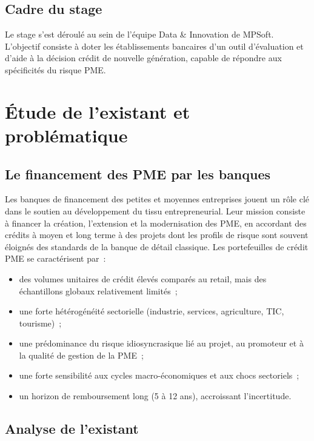 \documentclass[a4paper,12pt,oneside]{report}
\begin{document}
\subsection{Cadre du stage}

Le stage s'est déroulé au sein de l'équipe Data \& Innovation de MPSoft. L'objectif consiste
à doter les établissements bancaires d'un outil d'évaluation et d'aide à la décision crédit
de nouvelle génération, capable de répondre aux spécificités du risque PME.

\section{Étude de l'existant et problématique}

\subsection{Le financement des PME par les banques}

Les banques de financement des petites et moyennes entreprises jouent un rôle clé dans
le soutien au développement du tissu entrepreneurial. Leur mission consiste à financer la
création, l'extension et la modernisation des PME, en accordant des crédits à moyen et long
terme à des projets dont les profils de risque sont souvent éloignés des standards de la banque de
détail classique. Les portefeuilles de crédit PME se caractérisent par~:

\begin{itemize}
  \item des volumes unitaires de crédit élevés comparés au retail, mais des
        échantillons globaux relativement limités~;
  \item une forte hétérogénéité sectorielle (industrie, services, agriculture,
        TIC, tourisme)~;
  \item une prédominance du risque idiosyncrasique lié au projet, au promoteur
        et à la qualité de gestion de la PME~;
  \item une forte sensibilité aux cycles macro-économiques et aux chocs
        sectoriels~;
  \item un horizon de remboursement long (5 à 12 ans), accroissant l'incertitude.
\end{itemize}

\subsection{Analyse de l'existant}
\end{document}
